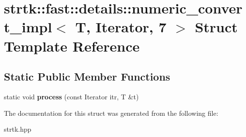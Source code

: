 \hypertarget{structstrtk_1_1fast_1_1details_1_1numeric__convert__impl_3_01T_00_01Iterator_00_017_01_4}{\section{strtk\-:\-:fast\-:\-:details\-:\-:numeric\-\_\-convert\-\_\-impl$<$ T, Iterator, 7 $>$ Struct Template Reference}
\label{structstrtk_1_1fast_1_1details_1_1numeric__convert__impl_3_01T_00_01Iterator_00_017_01_4}
}
\subsection*{Static Public Member Functions}
\begin{DoxyCompactItemize}
\item 
\hypertarget{structstrtk_1_1fast_1_1details_1_1numeric__convert__impl_3_01T_00_01Iterator_00_017_01_4_abfb5400c7762efc3b4289fa05a9cd283}{static void {\bfseries process} (const Iterator itr, T \&t)}\label{structstrtk_1_1fast_1_1details_1_1numeric__convert__impl_3_01T_00_01Iterator_00_017_01_4_abfb5400c7762efc3b4289fa05a9cd283}

\end{DoxyCompactItemize}


The documentation for this struct was generated from the following file\-:\begin{DoxyCompactItemize}
\item 
strtk.\-hpp\end{DoxyCompactItemize}
